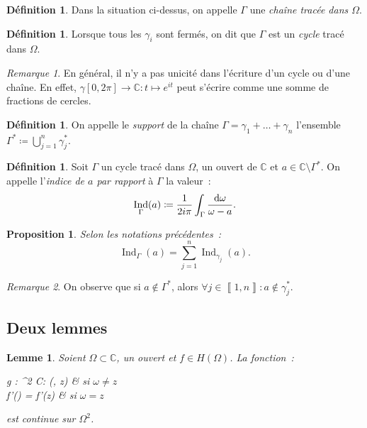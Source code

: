 \documentclass{report}
\newtheorem{prp}[thm]{Proposition}
\newtheorem{lem}[thm]{Lemme}
\theoremstyle{definition}
\newtheorem{déf}[thm]{Définition}
\theoremstyle{remark}
\newtheorem*{rmq}{Remarque}
\numberwithin{equation}{section}
\newcommand{\C}{\mathbb C}
\DeclareMathOperator{\Ind}{Ind}
\newcommand{\intint}[2]{\left\llbracket#1, #2\right\rrbracket}
\begin{document}
			\begin{déf} Dans la situation ci-dessus, on appelle $\Gamma$ une \textit{chaîne tracée dans $\Omega$}.
			\end{déf}

			\begin{déf} Lorsque tous les $\gamma_i$ sont fermés, on dit que $\Gamma$ est un \textit{cycle} tracé dans $\Omega$.
			\end{déf}

			\begin{rmq} En général, il n'y a pas unicité dans l'écriture d'un cycle ou d'une chaîne. En effet, $\gamma [0, 2\pi] \to \C : t \mapsto e^{it}$ peut
			s'écrire comme une somme de fractions de cercles.
			\end{rmq}

			\begin{déf} On appelle le \textit{support} de la chaîne $\Gamma = \gamma_1 + \ldots + \gamma_n$ l'ensemble $\Gamma^* \coloneqq \bigcup_{j=1}^n\gamma_j^*$.
			\end{déf}

			\begin{déf} Soit $\Gamma$ un cycle tracé dans $\Omega$, un ouvert de $\C$ et $a \in \C \setminus \Gamma^*$. On appelle l'\textit{indice de $a$ par
			rapport} à $\Gamma$ la valeur~:
			\begin{equation}
				\Ind_\Gamma(a) \coloneqq \frac 1{2i\pi}\int_\Gamma\frac {\dif \omega}{\omega-a}.
			\end{equation}
			\end{déf}

			\begin{prp} Selon les notations précédentes~:
			\begin{equation}
				\Ind_\Gamma(a) = \sum_{j=1}^n\Ind_{\gamma_j}(a).
			\end{equation}
			\end{prp}

			\begin{rmq} On observe que si $a \not \in \Gamma^*$, alors $\forall j \in \intint 1n : a \not \in \gamma_j^*$.
			\end{rmq}

		\subsection{Deux lemmes}
			\begin{lem}\label{lem:pré-Cauchy-1} Soient $\Omega \subset \C$, un ouvert et $f \in H(\Omega)$. La fonction~:
			\begin{subnumcases}
				{g : \Omega^2 \to \C : (\omega, z) \mapsto}
					 & si $\omega \neq z$ \\
					f'(\omega) = f'(z) & si $\omega = z$
			\end{subnumcases}
			est continue sur $\Omega^2$.
			\end{lem}
\end{document}
